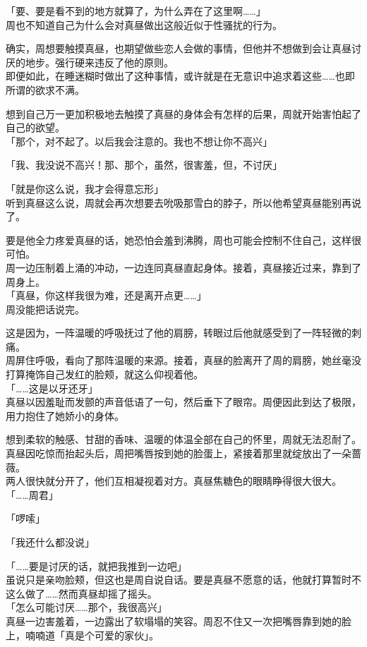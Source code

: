 「要、要是看不到的地方就算了，为什么弄在了这里啊……」\\

周也不知道自己为什么会对真昼做出这般近似于性骚扰的行为。

确实，周想要触摸真昼，也期望做些恋人会做的事情，但他并不想做到会让真昼讨厌的地步。强行硬来违反了他的原则。\\

即便如此，在睡迷糊时做出了这种事情，或许就是在无意识中追求着这些……也即所谓的欲求不满。

想到自己万一更加积极地去触摸了真昼的身体会有怎样的后果，周就开始害怕起了自己的欲望。\\

「那个，对不起了。以后我会注意的。我也不想让你不高兴」

「我、我没说不高兴！那、那个，虽然，很害羞，但，不讨厌」

「就是你这么说，我才会得意忘形」\\

听到真昼这么说，周就会再次想要去吮吸那雪白的脖子，所以他希望真昼能别再说了。

要是他全力疼爱真昼的话，她恐怕会羞到沸腾，周也可能会控制不住自己，这样很可怕。\\

周一边压制着上涌的冲动，一边连同真昼直起身体。接着，真昼接近过来，靠到了周身上。\\

「真昼，你这样我很为难，还是离开点更……」\\

周没能把话说完。

这是因为，一阵温暖的呼吸抚过了他的肩膀，转眼过后他就感受到了一阵轻微的刺痛。\\

周屏住呼吸，看向了那阵温暖的来源。接着，真昼的脸离开了周的肩膀，她丝毫没打算掩饰自己发红的脸颊，就这么仰视着他。\\

「……这是以牙还牙」\\

真昼以因羞耻而发颤的声音低语了一句，然后垂下了眼帘。周便因此到达了极限，用力抱住了她娇小的身体。

想到柔软的触感、甘甜的香味、温暖的体温全部在自己的怀里，周就无法忍耐了。\\

真昼因吃惊而抬起头后，周把嘴唇按到她的脸蛋上，紧接着那里就绽放出了一朵蔷薇。\\

两人很快就分开了，他们互相凝视着对方。真昼焦糖色的眼睛睁得很大很大。\\

「……周君」

「啰嗦」

「我还什么都没说」

「……要是讨厌的话，就把我推到一边吧」\\

虽说只是亲吻脸颊，但这也是周自说自话。要是真昼不愿意的话，他就打算暂时不这么做了……然而真昼却摇了摇头。\\

「怎么可能讨厌……那个，我很高兴」\\

真昼一边害羞着，一边露出了软塌塌的笑容。周忍不住又一次把嘴唇靠到她的脸上，喃喃道「真是个可爱的家伙」。
